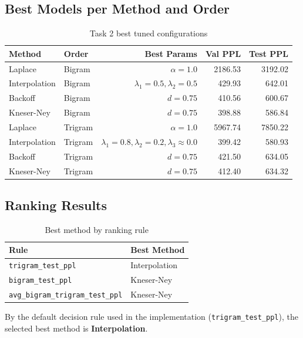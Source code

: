\documentclass[10pt,a4paper]{article}
\begin{document}
\subsection{Best Models per Method and Order}
\begin{table}[H]
\centering
\caption{Task 2 best tuned configurations}
\label{tab:task2-methods}
\begin{tabular}{llrrr}
\toprule
\textbf{Method} & \textbf{Order} & \textbf{Best Params} & \textbf{Val PPL} & \textbf{Test PPL} \\
\midrule
Laplace & Bigram & $\alpha=1.0$ & 2186.53 & 3192.02 \\
Interpolation & Bigram & $\lambda_1=0.5,\lambda_2=0.5$ & 429.93 & 642.01 \\
Backoff & Bigram & $d=0.75$ & 410.56 & 600.67 \\
Kneser-Ney & Bigram & $d=0.75$ & 398.88 & 586.84 \\
Laplace & Trigram & $\alpha=1.0$ & 5967.74 & 7850.22 \\
Interpolation & Trigram & $\lambda_1=0.8,\lambda_2=0.2,\lambda_3\approx 0.0$ & 399.42 & 580.93 \\
Backoff & Trigram & $d=0.75$ & 421.50 & 634.05 \\
Kneser-Ney & Trigram & $d=0.75$ & 412.40 & 634.32 \\
\bottomrule
\end{tabular}
\end{table}

\subsection{Ranking Results}
\begin{table}[H]
\centering
\caption{Best method by ranking rule}
\label{tab:task2-ranking}
\begin{tabular}{ll}
\toprule
\textbf{Rule} & \textbf{Best Method} \\
\midrule
\texttt{trigram\_test\_ppl} & Interpolation \\
\texttt{bigram\_test\_ppl} & Kneser-Ney \\
\texttt{avg\_bigram\_trigram\_test\_ppl} & Kneser-Ney \\
\bottomrule
\end{tabular}
\end{table}

By the default decision rule used in the implementation (\texttt{trigram\_test\_ppl}), the selected best method is \textbf{Interpolation}.
\end{document}

